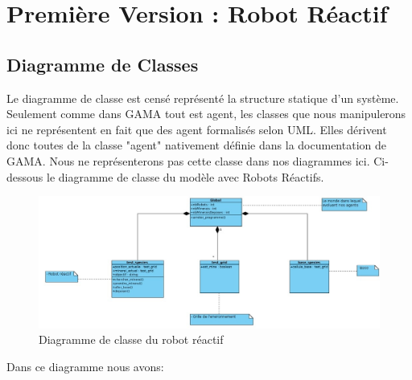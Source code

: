 \chapter{Première Version : Robot Réactif}



\section{Diagramme de Classes}

Le diagramme de classe est censé représenté la structure statique d'un système. Seulement comme dans GAMA tout est agent, les classes que nous manipulerons ici ne représentent en fait que des agent formalisés selon UML. Elles dérivent donc toutes de la classe "agent" nativement définie dans la documentation de GAMA. Nous ne représenterons pas cette classe dans nos diagrammes ici. 
Ci-dessous le diagramme de classe du modèle avec Robots Réactifs. 

\begin{figure}[h!]
	\begin{center}
		\includegraphics[width=500pt]{diagrammes/diagramme_classe_reactif}
	\end{center}
	\caption{Diagramme de classe du robot réactif}
\end{figure}


Dans ce diagramme nous avons:

